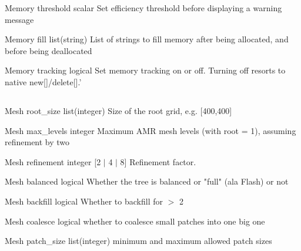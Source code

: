 \documentclass{article}
\begin{document}
\Parameter
{Memory}
{}
{threshold}
{scalar}
{}
{Set efficiency threshold before displaying a warning message}
{}
{}

\Parameter
{Memory}
{}
{fill}
{list(string)}
{}
{List of strings to fill memory after being allocated, and before being deallocated}
{}
{}

\Parameter
{Memory}
{}
{tracking}
{logical}
{}
{Set memory tracking on or off. Turning off resorts to native new[]/delete[].'}
{}
{}

\subsection{}

\Parameter
{Mesh}
{}
{root\_size}
{list(integer)}
{}
{Size of the root grid, e.g. [400,400]}
{}
{}

\Parameter
{Mesh}
{}
{max\_levels}
{integer}
{}
{Maximum AMR mesh levels (with root = 1), assuming refinement by two}
{}
{}

\Parameter
{Mesh}
{}
{refinement}
{integer}
{[2 $|$ 4 $|$ 8]}
{Refinement factor.}
{}
{}

\Parameter
{Mesh}
{}
{balanced}
{logical}
{}
{Whether the tree is balanced or "full" (ala Flash) or not}
{}
{}

\Parameter
{Mesh}
{}
{backfill}
{logical}
{}
{Whether to backfill for  $>$ 2}
{}
{}

\Parameter
{Mesh}
{}
{coalesce}
{logical}
{}
{whether to coalesce small patches into one big one}
{}
{}

\Parameter
{Mesh}
{}
{patch\_size}
{list(integer)}
{}
{minimum and maximum allowed patch sizes}
{}
{}
\end{document}
